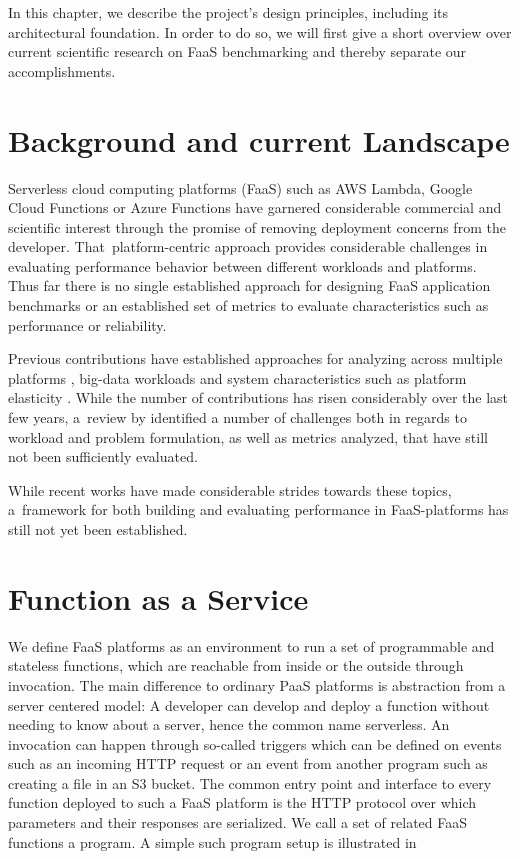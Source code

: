 \documentclass[../main.tex]{subfiles}
\begin{document}
In this chapter, we describe the project's design principles,
including its architectural foundation.
In order to do so, we will first give a short overview over current scientific 
research on FaaS benchmarking and thereby separate our accomplishments.

\section{Background and current Landscape}\label{sec:background}

Serverless cloud computing platforms (FaaS) such as AWS Lambda, Google Cloud Functions or Azure Functions 
have garnered considerable commercial and scientific interest through the promise of removing deployment concerns from the developer. 
That~platform-centric approach provides considerable challenges in evaluating performance behavior between different workloads and platforms. 
Thus far there is no single established approach for designing FaaS application benchmarks or an established set of metrics 
to evaluate characteristics such as performance or reliability.

Previous contributions have established approaches for analyzing across multiple platforms \cite{malawski_benchmarking_2018}, 
big-data workloads \cite{kuhlenkamp_evaluation_2019} and system characteristics such as platform elasticity \cite{kuhlenkamp_benchmarking_2020}. 
While the number of contributions has risen considerably over the last few years, 
a~review by \textcite{kuhlenkamp_benchmarking_2018} identified a number of challenges both in regards to workload and problem formulation, 
as well as metrics analyzed, that have still not been sufficiently evaluated.

While recent works \cites{kuhlenkamp_benchmarking_2020,van_eyk_beyond_2020} have made considerable strides towards these topics, 
a~framework for both building and evaluating performance in FaaS-platforms has still not yet been established.

\section{Function as a Service}\label{sec:FaaS}

We define FaaS platforms as an environment to run a set of programmable and stateless functions,
which are reachable from inside or the outside through invocation. 
The main difference to ordinary PaaS platforms is abstraction from a server centered model: 
A developer can develop and deploy a function without needing to know about a server, hence the common name serverless. 
An invocation can happen through so-called triggers which can be defined on events 
such as an incoming HTTP request or an event from another program such as creating a file in an S3 bucket. 
The common entry point and interface to every function deployed to such a FaaS platform is the HTTP protocol 
over which parameters and their responses are serialized. 
We call a set of related FaaS functions a program. A simple such program setup is illustrated in 
\end{document}
